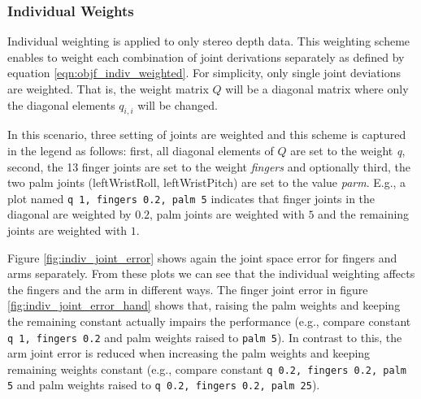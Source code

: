 \subsubsection{Individual Weights}

Individual weighting is applied to only stereo depth data. This weighting scheme enables to weight each combination of joint derivations separately as defined by equation \ref{eqn:objf_indiv_weighted}. For simplicity, only single joint deviations are weighted. That is, the weight matrix $Q$ will be a diagonal matrix where only the diagonal elements $q_{i,i}$ will be changed.

In this scenario, three setting of joints are weighted and this scheme is captured in the legend as follows: first, all diagonal elements of $Q$ are set to the weight \emph{q}, second, the 13 finger joints are set to the weight \emph{fingers} and optionally third, the two palm joints (leftWristRoll, leftWristPitch) are set to the value \emph{parm}. E.g., a plot named \texttt{q 1, fingers 0.2, palm 5} indicates that finger joints in the diagonal are weighted by $0.2$, palm joints are weighted with $5$ and the remaining joints are weighted with $1$.

Figure \ref{fig:indiv_joint_error} shows again the joint space error for fingers and arms separately. From these plots we can see that the individual weighting affects the fingers and the arm in different ways. The finger joint error in figure \ref{fig:indiv_joint_error_hand} shows that, raising the palm weights and keeping the remaining constant actually impairs the performance (e.g., compare constant \texttt{q 1, fingers 0.2} and palm weights raised to \texttt{palm 5}). In contrast to this, the arm joint error is reduced when increasing the palm weights and keeping remaining weights constant (e.g., compare constant \texttt{q 0.2, fingers 0.2, palm 5} and palm weights raised to \texttt{q 0.2, fingers 0.2, palm 25}).

